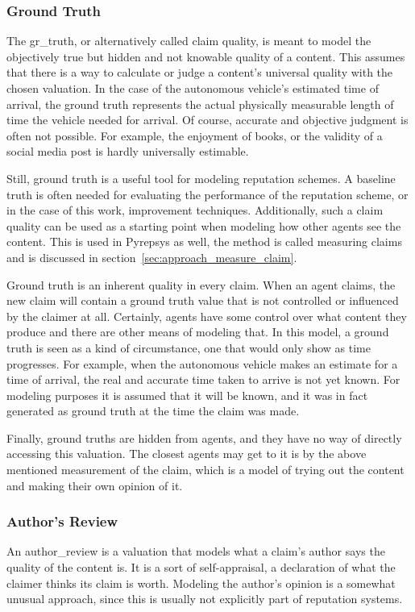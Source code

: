 \documentclass[%
    ]{\PathToTumTemplate/thesis/tum_thesis}
\begin{document}
\subsubsection{Ground Truth}\label{sec:approach_gr_truth}
The \gls{gr_truth}, or alternatively called claim quality, is meant to model the objectively true but hidden and not knowable quality of a content.
This assumes that there is a way to calculate or judge a content's universal quality with the chosen valuation.
In the case of the autonomous vehicle's estimated time of arrival, the ground truth represents the actual physically measurable length of time the vehicle needed for arrival.
Of course, accurate and objective judgment is often not possible.
For example, the enjoyment of books, or the validity of a social media post is hardly universally estimable.

Still, ground truth is a useful tool for modeling reputation schemes.
A baseline truth is often needed for evaluating the performance of the reputation scheme, or in the case of this work, improvement techniques.
Additionally, such a claim quality can be used as a starting point when modeling how other agents see the content.
This is used in Pyrepsys as well, the method is called measuring claims and is discussed in section~\ref{sec:approach_measure_claim}.

Ground truth is an inherent quality in every claim.
When an agent claims, the new claim will contain a ground truth value that is not controlled or influenced by the claimer at all.
Certainly, agents have some control over what content they produce and there are other means of modeling that.
In this model, a ground truth is seen as a kind of circumstance, one that would only show as time progresses.
For example, when the autonomous vehicle makes an estimate for a time of arrival, the real and accurate time taken to arrive is not yet known.
For modeling purposes it is assumed that it will be known, and it was in fact generated as ground truth at the time the claim was made.

Finally, ground truths are hidden from agents, and they have no way of directly accessing this valuation.
The closest agents may get to it is by the above mentioned measurement of the claim, which is a model of trying out the content and making their own opinion of it.

\subsubsection{Author's Review}\label{sec:approach_author_review}
An \gls{author_review} is a valuation that models what a claim's author says the quality of the content is.
It is a sort of self-appraisal, a declaration of what the claimer thinks its claim is worth.
Modeling the author's opinion is a somewhat unusual approach, since this is usually not explicitly part of reputation systems.
\end{document}
